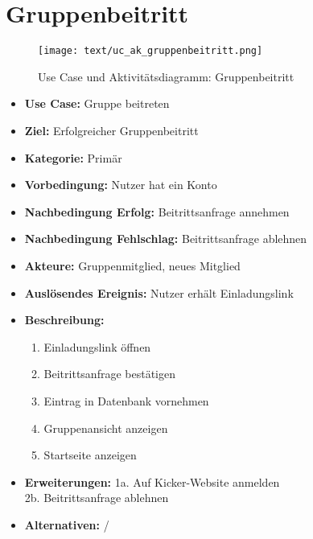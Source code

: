 \section{Gruppenbeitritt}
\begin{figure}[h!]
	\centering
	\texttt{[image: text/uc\_ak\_gruppenbeitritt.png]}
	\caption{Use Case und Aktivitätsdiagramm: Gruppenbeitritt}
	\label{uc_ac_gruppenbeitritt}
\end{figure}
\begin{itemize}
	\item \textbf{Use Case:} Gruppe beitreten
	\item \textbf{Ziel:} Erfolgreicher Gruppenbeitritt
	\item \textbf{Kategorie:} Primär
	\item \textbf{Vorbedingung:} Nutzer hat ein Konto
	\item \textbf{Nachbedingung Erfolg:} Beitrittsanfrage annehmen
	\item \textbf{Nachbedingung Fehlschlag:} Beitrittsanfrage ablehnen
	\item \textbf{Akteure:} Gruppenmitglied, neues Mitglied
	\item \textbf{Auslösendes Ereignis:} Nutzer erhält Einladungslink
	\item \textbf{Beschreibung:} \begin{enumerate}
		\item Einladungslink öffnen
		\item Beitrittsanfrage bestätigen
		\item Eintrag in Datenbank vornehmen
		\item Gruppenansicht anzeigen
		\item Startseite anzeigen
	\end{enumerate}
	\item \textbf{Erweiterungen:} 1a. Auf Kicker-Website anmelden\\
	2b. Beitrittsanfrage ablehnen
	\item \textbf{Alternativen:} /
\end{itemize}
